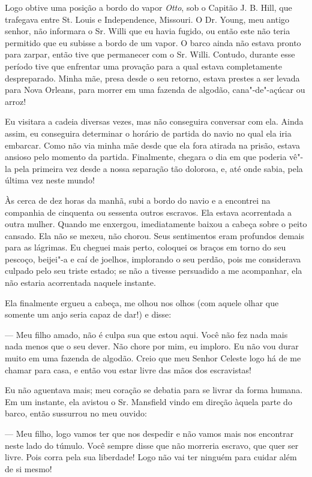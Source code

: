 Logo obtive uma posição a bordo do vapor \emph{Otto}, sob o Capitão J.
B. Hill, que trafegava entre St. Louis e Independence, Missouri. O Dr.
Young, meu antigo senhor, não informara o Sr. Willi que eu havia fugido,
ou então este não teria permitido que eu subisse a bordo de um vapor. O
barco ainda não estava pronto para zarpar, então tive que permanecer com
o Sr. Willi. Contudo, durante esse período tive que enfrentar uma
provação para a qual estava completamente despreparado. Minha mãe, presa
desde o seu retorno, estava prestes a ser levada para Nova Orleans, para
morrer em uma fazenda de algodão, cana"-de"-açúcar ou arroz!

Eu visitara a cadeia diversas vezes, mas não conseguira conversar com
ela. Ainda assim, eu conseguira determinar o horário de partida do navio
no qual ela iria embarcar. Como não via minha mãe desde que ela fora
atirada na prisão, estava ansioso pelo momento da partida. Finalmente,
chegara o dia em que poderia vê"-la pela primeira vez desde a nossa
separação tão dolorosa, e, até onde sabia, pela última vez neste mundo!

Às cerca de dez horas da manhã, subi a bordo do navio e a encontrei na
companhia de cinquenta ou sessenta outros escravos. Ela estava
acorrentada a outra mulher. Quando me enxergou, imediatamente baixou a
cabeça sobre o peito cansado. Ela não se mexeu, não chorou. Seus
sentimentos eram profundos demais para as lágrimas. Eu cheguei mais
perto, coloquei os braços em torno do seu pescoço, beijei"-a e caí de
joelhos, implorando o seu perdão, pois me considerava culpado pelo seu
triste estado; se não a tivesse persuadido a me acompanhar, ela não
estaria acorrentada naquele instante.

Ela finalmente ergueu a cabeça, me olhou nos olhos (com aquele olhar que
somente um anjo seria capaz de dar!) e disse:

--- Meu filho amado, não é culpa sua que estou aqui. Você não fez nada
mais nada menos que o seu dever. Não chore por mim, eu imploro. Eu não
vou durar muito em uma fazenda de algodão. Creio que meu Senhor Celeste
logo há de me chamar para casa, e então vou estar livre das mãos dos
escravistas!

Eu não aguentava mais; meu coração se debatia para se livrar da forma
humana. Em um instante, ela avistou o Sr. Mansfield vindo em direção
àquela parte do barco, então sussurrou no meu ouvido:

--- Meu filho, logo vamos ter que nos despedir e não vamos mais nos
encontrar neste lado do túmulo. Você sempre disse que não morreria
escravo, que quer ser livre. Pois corra pela sua liberdade! Logo não vai
ter ninguém para cuidar além de si mesmo!

